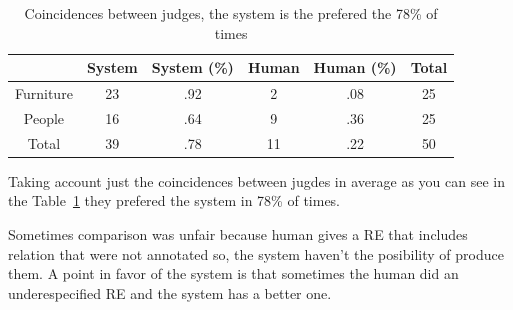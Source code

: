 

\begin{table}[h!]
\begin{center}
\begin{tabular}{|c|c|c|c|c|c|}
\hline
           & System & System (\%) & Human & Human (\%) & Total\\
\hline
Furniture & 23  & .92 &  2 & .08  & 25 \\
People    & 16  & .64 & 9  & .36 & 25 \\
\hline
Total     & 39  & .78    & 11 & .22 & 50  \\
\hline
\end{tabular}
\caption{Coincidences between judges, the system is the prefered the 78\% of times} 
\label{system-better}
\end{center}
\end{table}
Taking account just the coincidences between jugdes in average as you can see in the Table~\ref{system-better} they prefered the system in 78\% of times.

Sometimes comparison was unfair because human gives a RE that includes relation that were not annotated so, the system haven't the posibility of produce them. A point in favor of the system is that sometimes the human did an underespecified RE and the system has a better one.\\


